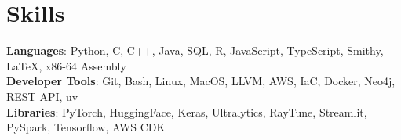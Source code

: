 \documentclass[letterpaper,11pt]{article}
\begin{document}
%
\section{Skills}
 \begin{itemize}[leftmargin=0.15in, label={}]
    \small{\item{
     \textbf{Languages}{: Python, C, C++, Java, SQL, R, JavaScript, TypeScript, Smithy, LaTeX, x86-64 Assembly} \\
     \textbf{Developer Tools}{: Git, Bash, Linux, MacOS, LLVM, AWS, IaC, Docker, Neo4j, REST API, uv} \\
     \textbf{Libraries}{: PyTorch, HuggingFace, Keras, Ultralytics, RayTune, Streamlit, PySpark, Tensorflow, AWS CDK} \\
    }}
 \end{itemize}


\end{document}
